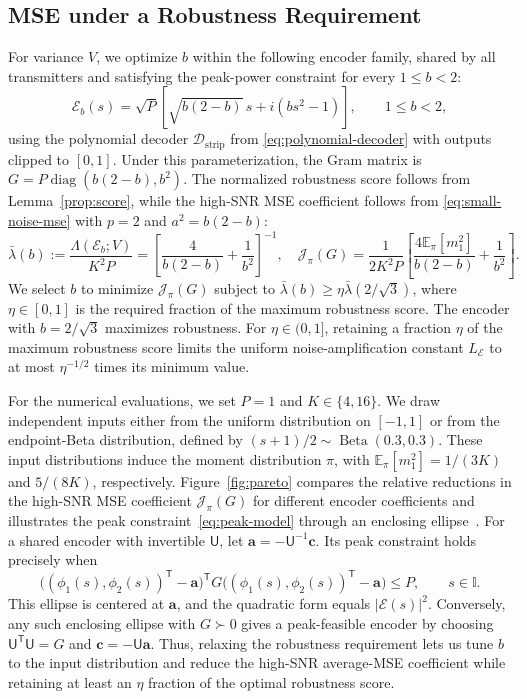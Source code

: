 \documentclass[journal,12pt,onecolumn,draftclsnofoot]{IEEEtran}
\newcommand{\enc}{\mathscr{E}}\newcommand{\dec}{\mathscr{D}}\newcommand{\R}{\mathbb R}\newcommand{\C}{\mathbb C}
\newcommand{\T}{\mathsf T}\newcommand{\suc}{\succeq}
\begin{document}



\subsection{MSE under a Robustness Requirement}\label{sec:pareto-evidence}



For variance $V$, we optimize $b$ within the following encoder family, shared by all transmitters and satisfying the peak-power constraint for every $1\le b<2$:
$$
 \enc_b(s)=\sqrt P\left[\sqrt{b(2-b)}\,s+i(bs^2-1)\right],
 \qquad 1\le b<2,
$$
using the polynomial decoder $\dec_{\mathrm{strip}}$ from \eqref{eq:polynomial-decoder} with outputs clipped to $[0,1]$. Under this parameterization, the Gram matrix is $G=P\operatorname{diag}(b(2-b),b^2)$. The normalized robustness score follows from
Lemma~\ref{prop:score}, while the high-SNR MSE coefficient
follows from \eqref{eq:small-noise-mse} with $p=2$ and
$a^2=b(2-b)$:
$$
\bar\lambda(b):=\frac{{\Lambda(\enc_b;V)}}{K^2P}
 =\left[\frac{4}{b(2-b)}+\frac1{b^2}\right]^{-1},\quad
 \mathcal J_\pi(G)=\frac1{2K^2P}
 \left[\frac{4\mathbb E_\pi[m_1^2]}{b(2-b)}+\frac1{b^2}\right].
$$
We select $b$ to minimize $\mathcal J_\pi(G)$ subject to
$\bar\lambda(b)\ge\eta\bar\lambda(2/\sqrt3)$, where
$\eta\in[0,1]$ is the required fraction of the maximum robustness score. The encoder with $b=2/\sqrt3$ maximizes robustness. For $\eta\in(0,1]$, retaining a fraction $\eta$ of the maximum robustness score limits the uniform noise-amplification constant $L_\enc$ to at most $\eta^{-1/2}$ times its minimum value.




For the numerical evaluations, we set $P=1$ and $K\in\{4,16\}$.
We draw independent inputs either from the uniform distribution on $[-1,1]$ or
from the endpoint-Beta distribution, defined by
$(s+1)/2\sim\operatorname{Beta}(0.3,0.3)$. These input distributions induce the moment distribution $\pi$, with $\mathbb E_\pi[m_1^2]=1/(3K)$ and $5/(8K)$, respectively. Figure~\ref{fig:pareto} compares the relative reductions in the high-SNR MSE coefficient $\mathcal J_\pi(G)$ for different
encoder coefficients and illustrates the peak constraint~\eqref{eq:peak-model} through an enclosing ellipse~\cite{boyd2004}. For a shared encoder with invertible
$\mathsf U$, let $\boldsymbol a=-\mathsf U^{-1}\boldsymbol c$.
Its peak constraint holds precisely when
$$
\bigl((\phi_1(s),\phi_2(s))^\T-\boldsymbol a\bigr)^\T
G\bigl((\phi_1(s),\phi_2(s))^\T-\boldsymbol a\bigr)
\le P,\qquad s\in\mathbb I.
$$
This ellipse is centered at $\boldsymbol a$, and the quadratic
form equals $|\enc(s)|^2$. Conversely, any such enclosing ellipse
with $G\succ0$ gives a peak-feasible encoder by choosing
$\mathsf U^\T\mathsf U=G$ and
$\boldsymbol c=-\mathsf U\boldsymbol a$. Thus, relaxing the robustness requirement lets us tune $b$ to the input distribution and reduce the high-SNR average-MSE coefficient while retaining at least an $\eta$ fraction of the optimal robustness score.
\end{document}
